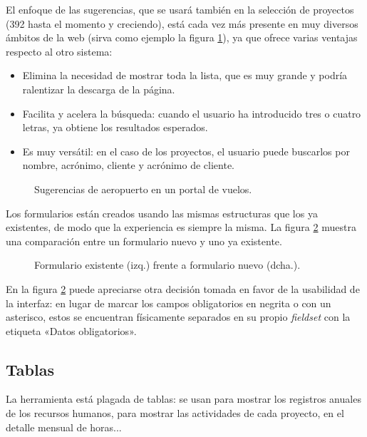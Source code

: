 El enfoque de las sugerencias, que se usará también en la selección de
proyectos (392 hasta el momento y creciendo), está cada vez más presente en muy
diversos ámbitos de la web (sirva como ejemplo la figura
\ref{fig:sugerencias_web}), ya que ofrece varias ventajas respecto al otro
sistema:

\begin{itemize}
 \item Elimina la necesidad de mostrar toda la lista, que es muy grande y
podría ralentizar la descarga de la página.
 \item Facilita y acelera la búsqueda: cuando el usuario ha introducido tres o
cuatro letras, ya obtiene los resultados esperados.
 \item Es muy versátil: en el caso de los proyectos,
el usuario puede buscarlos por nombre, acrónimo, cliente y acrónimo de cliente.
\end{itemize}


\begin{figure}
\centering
{}
\caption{Sugerencias de aeropuerto en un portal de vuelos.}
\label{fig:sugerencias_web}
\end{figure}

Los formularios están creados usando las mismas estructuras que los ya
existentes, de modo que la experiencia es siempre la misma. La figura
\ref{fig:comparacion_formularios} muestra una comparación entre un formulario
nuevo y uno ya existente.

\begin{figure}
\centering
{}
\caption{Formulario existente (izq.) frente a formulario nuevo (dcha.).}
\label{fig:comparacion_formularios}
\end{figure}

En la figura \ref{fig:comparacion_formularios} puede apreciarse otra decisión
tomada en favor de la usabilidad de la interfaz: en lugar de marcar los campos
obligatorios en negrita o con un asterisco, estos se encuentran
físicamente separados en su propio \textit{fieldset} con la etiqueta «Datos
obligatorios».

\subsection{Tablas}

La herramienta está plagada de tablas: se usan para mostrar los registros
anuales de los recursos humanos, para mostrar las actividades de cada proyecto,
en el detalle mensual de horas...

